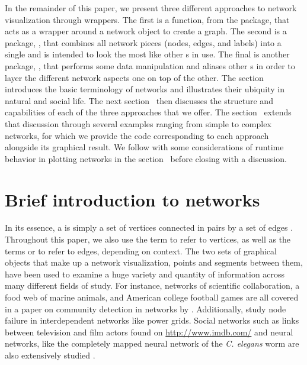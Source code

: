 In the remainder of this paper, we present three different approaches to network visualization through  wrappers. The first is a function,  from the  package, that acts as a wrapper around a network object to create a  graph. The second is a package, , that combines all network pieces (nodes, edges, and labels) into a single  and is intended to look the most like other  s in use. The final is another package, , that performs some data manipulation and aliases other s in order to layer the different network aspects one on top of the other. The section~ introduces the basic terminology of networks and illustrates their ubiquity in natural and social life. The next section~ then discusses the structure and capabilities of each of the three approaches that we offer. The section~ extends that discussion through several examples ranging from simple to complex networks, for which we provide the code corresponding to each approach alongside its graphical result. We follow with some considerations of runtime behavior in plotting networks in the section~ before closing with a discussion.

\section{Brief introduction to networks}
\label{sec:background}
In its essence, a  is simply a set of vertices connected in pairs by a set of edges \citep{newman}. Throughout this paper, we also use the term  to refer to vertices, as well as the terms  or  to refer to edges, depending on context. The two sets of graphical objects that make up a network visualization, points and segments between them, have been used to examine a huge variety and quantity of information across many different fields of study. For instance, networks of scientific collaboration, a food web of marine animals, and American college football games are all covered in a paper on community detection in networks by \citet{football}. Additionally, \citet{networkfailures} study node failure in interdependent networks like power grids.  Social networks such as links between television and film actors found on \url{http://www.imdb.com/} and neural networks, like the completely mapped neural network of the \textit{C. elegans} worm are also extensively studied \citep{smallworld}.


